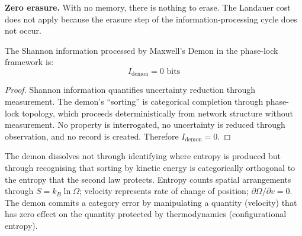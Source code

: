 \textbf{Zero erasure.} With no memory, there is nothing to erase. The Landauer cost does not apply because the erasure step of the information-processing cycle does not occur.

\begin{theorem}
\label{thm:demon_info}
The Shannon information processed by Maxwell's Demon in the phase-lock framework is:
\begin{equation}
I_{\mathrm{demon}} = 0 \text{ bits}
\end{equation}
\end{theorem}

\begin{proof}
Shannon information quantifies uncertainty reduction through measurement. The demon's ``sorting'' is categorical completion through phase-lock topology, which proceeds deterministically from network structure without measurement. No property is interrogated, no uncertainty is reduced through observation, and no record is created. Therefore $I_{\mathrm{demon}} = 0$.
\end{proof}

The demon dissolves not through identifying where entropy is produced but through recognising that sorting by kinetic energy is categorically orthogonal to the entropy that the second law protects. Entropy counts spatial arrangements through $S = k_B \ln \Omega$; velocity represents rate of change of position; $\partial \Omega/\partial v = 0$. The demon commits a category error by manipulating a quantity (velocity) that has zero effect on the quantity protected by thermodynamics (configurational entropy).
